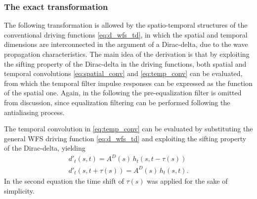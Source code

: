 \documentclass[conference]{IEEEtran}
\begin{document}
\subsubsection{The exact transformation}
The following transformation is allowed by the spatio-temporal structures of the conventional driving functions \eqref{eq:d_wfs_td}, in which the spatial and temporal dimensions are interconnected in the argument of a Dirac-delta, due to the wave propagation characteristics.
The main idea of the derivation is that by exploiting the sifting property of the Dirac-delta in the driving functions, both spatial and temporal convolutions \eqref{eq:spatial_conv} and \eqref{eq:temp_conv} can be evaluated, from which the temporal filter impulse responses can be expressed as the function of the spatial one.
Again, in the following the pre-equalization filter is omitted from discussion, since equalization filtering can be performed following the antialiasing process.

The temporal convolution in \eqref{eq:temp_conv} can be evaluated by substituting the general WFS driving function \eqref{eq:d_wfs_td} and exploiting the sifting property of the Dirac-delta, yielding
\begin{align}
    d'_t(s,t) = A^D(s) \, h_t \!\left(s,t- \tau(s) \right) \\
    d'_t(s,t + \tau(s) ) = A^D(s) \, h_t \!\left(s,t\right).
    \label{eq:temp_conv_eval}
\end{align}
In the second equation the time shift of $\tau(s)$ was applied for the sake of simplicity.
\end{document}
